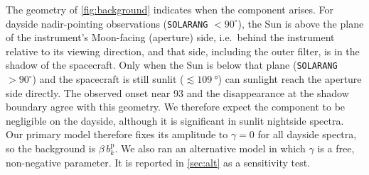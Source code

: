 The geometry of \cref{fig:background} indicates when the component arises. For dayside nadir-pointing observations (\texttt{SOLARANG} $<90^\circ$), the Sun is above the plane of the instrument's Moon-facing (aperture) side, i.e.\ behind the instrument relative to its viewing direction, and that side, including the outer filter, is in the shadow of the spacecraft. Only when the Sun is below that plane (\texttt{SOLARANG} $>90^\circ$) and the spacecraft is still sunlit ($\lesssim\SI{109}{\degree}$) can sunlight reach the aperture side directly. The observed onset near 93\textdegree{} and the disappearance at the shadow boundary agree with this geometry. We therefore expect the component to be negligible on the dayside, although it is significant in sunlit nightside spectra. Our primary model therefore fixes its amplitude to $\gamma=0$ for all dayside spectra, so the background is $\beta\,b^{\mathrm{p}}_k$. We also ran an alternative model in which $\gamma$ is a free, non-negative parameter. It is reported in \cref{sec:alt} as a sensitivity test.
